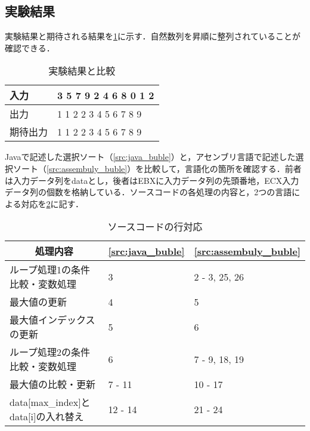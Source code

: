 \subsection{実験結果}
実験結果と期待される結果を\ref{tbl:execute}に示す．自然数列を昇順に整列されていることが確認できる．\par
\begin{table}[H]
    \centering
    \caption{実験結果と比較}
    \label{tbl:execute}
    \begin{tabular}{l|l}
        入力   & {\ttfamily 1 3 5 7 9 2 4 6 8 0 1 2} \\
        \hline
        出力   & {\ttfamily 0 1 1 2 2 3 4 5 6 7 8 9} \\
        期待出力 & {\ttfamily 0 1 1 2 2 3 4 5 6 7 8 9}
    \end{tabular}
\end{table}
{\ttfamily Java}で記述した選択ソート（\ref{src:java_buble}）と，アセンブリ言語で記述した選択ソート（\ref{src:assembuly_buble}）を比較して，言語化の箇所を確認する．前者は入力データ列を{\ttfamily data}とし，後者は{\ttfamily EBX}に入力データ列の先頭番地，{\ttfamily ECX}入力データ列の個数を格納している．ソースコードの各処理の内容と，2つの言語による対応を\ref{tbl:ソースコードの行対応}に記す．
\begin{table}[htbp]
    \centering
    \caption{ソースコードの行対応}
    \label{tbl:ソースコードの行対応}
    \begin{tabular}{p{10cm}p{2cm}p{2cm}}
        \multicolumn{1}{c}{処理内容}                              & \multicolumn{1}{c}{\ref{src:java_buble}} & \multicolumn{1}{c}{\ref{src:assembuly_buble}} \\
        \hline
        ループ処理1の条件比較・変数処理                                      & 3                                        & 2 - 3, 25, 26                                 \\
        最大値の更新                                                & 4                                        & 5                                             \\
        最大値インデックスの更新                                          & 5                                        & 6                                             \\
        ループ処理2の条件比較・変数処理                                      & 6                                        & 7 - 9, 18, 19                                 \\
        最大値の比較・更新                                             & 7 - 11                                   & 10 - 17                                       \\
        {\ttfamily data[max\_index]}と{\ttfamily data[i]}の入れ替え & 12 - 14                                  & 21 - 24                                       \\
        \hline
    \end{tabular}
\end{table}\\
